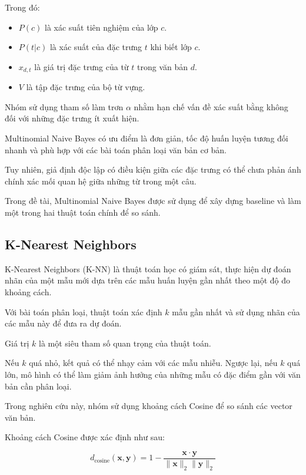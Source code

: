 Trong đó:

\begin{itemize}
    \item $P(c)$ là xác suất tiên nghiệm của lớp $c$.

    \item $P(t|c)$ là xác suất của đặc trưng $t$ khi biết lớp $c$.

    \item $x_{d,t}$ là giá trị đặc trưng của từ $t$ trong văn bản $d$.

    \item $V$ là tập đặc trưng của bộ từ vựng.
\end{itemize}

Nhóm sử dụng tham số làm trơn $\alpha$ nhằm hạn chế vấn đề xác suất bằng không đối với những đặc trưng ít xuất hiện.

Multinomial Naive Bayes có ưu điểm là đơn giản, tốc độ huấn luyện tương đối nhanh và phù hợp với các bài toán phân loại văn bản cơ bản.

Tuy nhiên, giả định độc lập có điều kiện giữa các đặc trưng có thể chưa phản ánh chính xác mối quan hệ giữa những từ trong một câu.

Trong đề tài, Multinomial Naive Bayes được sử dụng để xây dựng baseline và làm một trong hai thuật toán chính để so sánh.


\subsection{K-Nearest Neighbors}

K-Nearest Neighbors (K-NN) là thuật toán học có giám sát, thực hiện dự đoán nhãn của một mẫu mới dựa trên các mẫu huấn luyện gần nhất theo một độ đo khoảng cách.

Với bài toán phân loại, thuật toán xác định $k$ mẫu gần nhất và sử dụng nhãn của các mẫu này để đưa ra dự đoán.

Giá trị $k$ là một siêu tham số quan trọng của thuật toán.

Nếu $k$ quá nhỏ, kết quả có thể nhạy cảm với các mẫu nhiễu. Ngược lại, nếu $k$ quá lớn, mô hình có thể làm giảm ảnh hưởng của những mẫu có đặc điểm gần với văn bản cần phân loại.

Trong nghiên cứu này, nhóm sử dụng khoảng cách Cosine để so sánh các vector văn bản.

Khoảng cách Cosine được xác định như sau:

\begin{equation}
d_{\text{cosine}}(\mathbf{x},\mathbf{y})
=
1-
\frac{
\mathbf{x}\cdot\mathbf{y}
}{
\|\mathbf{x}\|_2\|\mathbf{y}\|_2
}
\end{equation}

